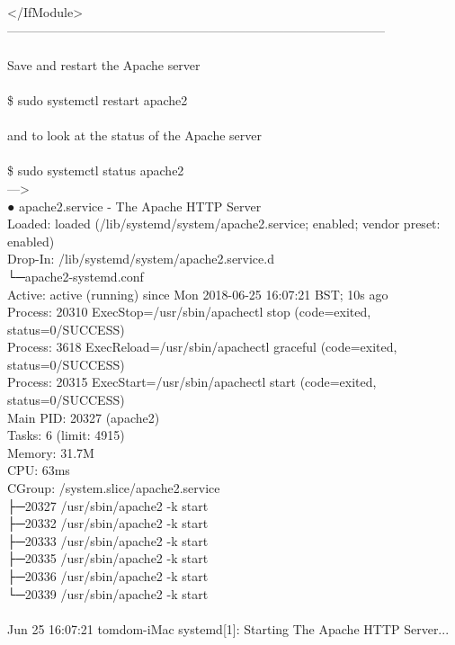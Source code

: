 \documentclass[10pt,a4paper]{article}
\begin{document}
{{{{{{{{{{{{{{{{</IfModule>\\
------------------------------------------------------------------------------------------\\
\\
Save and restart the Apache server\\
\\
\$ sudo systemctl restart apache2\\
\\
and to look at the status of the Apache server\\
\\
\$ sudo systemctl status apache2\\
--->\\
}● apache2.service - The Apache HTTP Server\\
   Loaded: loaded (/lib/systemd/system/apache2.service; enabled; vendor preset: enabled)\\
  Drop-In: /lib/systemd/system/apache2.service.d\\
           └─apache2-systemd.conf\\
   Active: active (running) since Mon 2018-06-25 16:07:21 BST; 10s ago\\
  Process: 20310 ExecStop=/usr/sbin/apachectl stop (code=exited, status=0/SUCCESS)\\
  Process: 3618 ExecReload=/usr/sbin/apachectl graceful (code=exited, status=0/SUCCESS)\\
  Process: 20315 ExecStart=/usr/sbin/apachectl start (code=exited, status=0/SUCCESS)\\
 Main PID: 20327 (apache2)\\
    Tasks: 6 (limit: 4915)\\
   Memory: 31.7M\\
      CPU: 63ms\\
   CGroup: /system.slice/apache2.service\\
           ├─20327 /usr/sbin/apache2 -k start\\
           ├─20332 /usr/sbin/apache2 -k start\\
           ├─20333 /usr/sbin/apache2 -k start\\
           ├─20335 /usr/sbin/apache2 -k start\\
           ├─20336 /usr/sbin/apache2 -k start\\
           └─20339 /usr/sbin/apache2 -k start\\
\\
Jun 25 16:07:21 tomdom-iMac systemd[1]: Starting The Apache HTTP Server...\\
}}}}}}}}}}}}}}}
\end{document}
